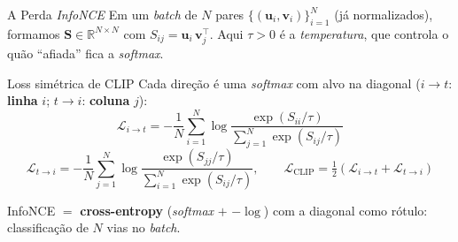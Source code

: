 \documentclass[aspectratio=169,xcolor=dvipsnames]{beamer}
\begin{document}
  \begin{frame}{A Perda \textit{InfoNCE}}
    Em um \textit{batch} de $N$ pares $\{(\mathbf{u}_i, \mathbf{v}_i)\}_{i=1}^{N}$ (já normalizados),
    formamos $\mathbf{S} \in \mathbb{R}^{N\times N}$ com $S_{ij}=\mathbf{u}_i\,\mathbf{v}_j^{\top}$. Aqui $\tau>0$ é a \textit{temperatura}, que controla o quão ``afiada'' fica a \textit{softmax}.

    \begin{block}{Loss simétrica de CLIP}
      \small
      Cada direção é uma \textit{softmax} com alvo na diagonal ($i\to t$: \textbf{linha} $i$; \quad $t\to i$: \textbf{coluna} $j$):
      \[
        \mathcal{L}_{i\to t} = -\frac{1}{N}\sum_{i=1}^{N}
          \log\frac{\exp(S_{ii}/\tau)}{\sum_{j=1}^{N}\exp(S_{ij}/\tau)}
      \]
      \[
        \mathcal{L}_{t\to i} = -\frac{1}{N}\sum_{j=1}^{N}
          \log\frac{\exp(S_{jj}/\tau)}{\sum_{i=1}^{N}\exp(S_{ij}/\tau)},\qquad
        \mathcal{L}_{\text{CLIP}} = \tfrac{1}{2}\left(\mathcal{L}_{i\to t} + \mathcal{L}_{t\to i}\right)
      \]
    \end{block}

    \vspace{0.1em}
    {\small InfoNCE $=$ \textbf{cross-entropy} (\textit{softmax} $+$ $-\log$) com a diagonal como rótulo: classificação de $N$ vias no \textit{batch}.}
  \end{frame}
\end{document}
